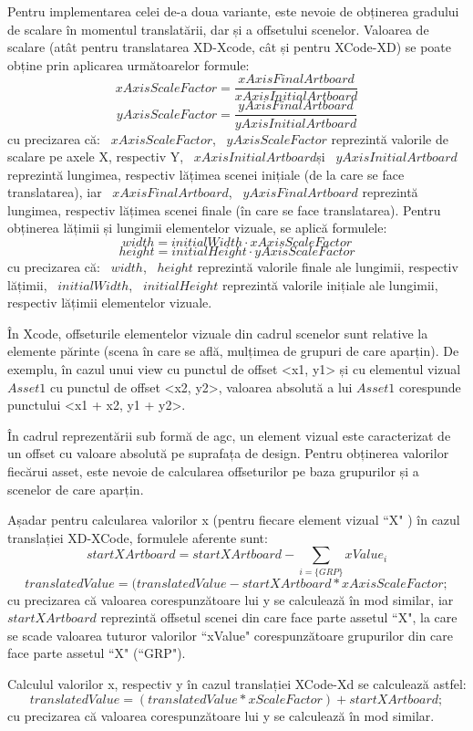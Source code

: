 Pentru implementarea celei de-a doua variante, este nevoie de obținerea gradului de scalare în momentul translatării, dar și a offsetului scenelor. Valoarea de scalare (atât pentru translatarea XD-Xcode, cât și pentru XCode-XD) se poate obține prin aplicarea următoarelor formule: 
\[ xAxisScaleFactor=\frac{xAxisFinalArtboard}{xAxisInitialArtboard} \]
\[ yAxisScaleFactor=\frac{yAxisFinalArtboard}{yAxisInitialArtboard} \]
cu precizarea că:
 ~$xAxisScaleFactor$, ~$yAxisScaleFactor$ reprezintă valorile de scalare pe axele X, respectiv Y,  ~$xAxisInitialArtboard$și ~$yAxisInitialArtboard$ reprezintă lungimea, respectiv lățimea scenei inițiale (de la care se face translatarea), iar ~$xAxisFinalArtboard$, ~$yAxisFinalArtboard$ reprezintă lungimea, respectiv lățimea scenei finale (în care se face translatarea).
Pentru obținerea lățimii și lungimii elementelor vizuale, se aplică formulele:
\[ width =  {initialWidth}\cdot{xAxisScaleFactor}\]
\[ height =  {initialHeight}\cdot{yAxisScaleFactor}\]
cu precizarea că:
~$width$, ~$height$ reprezintă valorile finale ale lungimii, respectiv lățimii, ~$initialWidth$, ~$initialHeight$ reprezintă valorile inițiale ale lungimii, respectiv lățimii elementelor vizuale.

În Xcode, offseturile elementelor vizuale din cadrul scenelor sunt relative la elemente părinte (scena în care se află, mulțimea de grupuri de care aparțin). De exemplu, în cazul unui view cu punctul de offset <x1, y1> și cu elementul vizual $Asset1$ cu punctul de offset <x2, y2>, valoarea absolută a lui $Asset1$ corespunde punctului <x1 + x2, y1 + y2>. 

În cadrul reprezentării sub formă de agc, un element vizual este caracterizat de un offset cu valoare absolută pe suprafața de design. Pentru obținerea valorilor fiecărui asset, este nevoie de calcularea offseturilor pe baza grupurilor și a scenelor de care aparțin.

Așadar pentru calcularea valorilor x (pentru fiecare element vizual ``X" ) în cazul translației XD-XCode, formulele aferente sunt:
        \[ startXArtboard = startXArtboard - \sum_{i = \{GRP\}} xValue_{i} \]
        \[ translatedValue = (translatedValue - startXArtboard * xAxisScaleFactor;\]
cu precizarea că valoarea corespunzătoare lui y se calculează în mod similar, iar ~$startXArtboard$ reprezintă offsetul scenei din care face parte assetul ``X", la care se scade valoarea tuturor valorilor ``xValue" corespunzătoare grupurilor din care face parte assetul ``X" (``GRP").

Calculul valorilor x, respectiv y în cazul translației XCode-Xd se calculează astfel:
        \[ translatedValue = (translatedValue * xScaleFactor) + startXArtboard; \]
cu precizarea că valoarea corespunzătoare lui y se calculează în mod similar.

